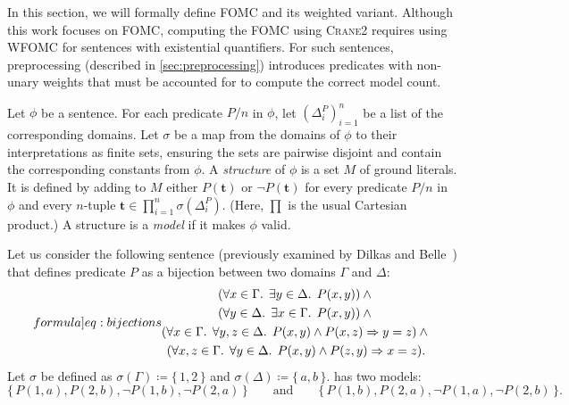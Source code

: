 \documentclass[a4paper,UKenglish,cleveref,autoref]{lipics-v2021}
\newcommand{\Cranetwo}{\textsc{Crane2}}
\begin{document}
In this section, we will formally define FOMC and its weighted variant. Although
this work focuses on FOMC, computing the FOMC using \Cranetwo{} requires using
WFOMC for sentences with existential quantifiers. For such sentences,
preprocessing (described in \cref{sec:preprocessing}) introduces predicates with
non-unary weights that must be accounted for to compute the correct model count.

\begin{definition}\label{def:model}
  Let $\phi$ be a sentence. For each predicate $P/n$ in $\phi$, let
  ${(\Delta_{i}^{P})}_{i=1}^{n}$ be a list of the corresponding domains. Let
  $\sigma$ be a map from the domains of $\phi$ to their interpretations as
  finite sets, ensuring the sets are pairwise disjoint and contain the
  corresponding constants from $\phi$. A \emph{structure} of $\phi$ is a set $M$
  of ground literals. It is defined by adding to $M$ either $P(\mathbf{t})$ or
  $\neg P(\mathbf{t})$ for every predicate $P/n$ in $\phi$ and every $n$-tuple
  $\mathbf{t} \in \prod_{i=1}^{n} \sigma(\Delta_{i}^{P})$. (Here, $\prod$ is the
  usual Cartesian product.) A structure is a \emph{model} if it makes $\phi$
  valid.
\end{definition}

\begin{example}\label{example:bijections}
  Let us consider the following sentence (previously examined by Dilkas and
  Belle~\cite{DBLP:conf/kr/DilkasB23}) that defines predicate $P$ as a bijection
  between two domains $\Gamma$ and $\Delta$:
  \begin{equation}\label[formula]{eq:bijections}
    \begin{gathered}
      (\forall x \in \Gamma\text{. }\exists y \in \Delta\text{. }P(x, y))\land{}\\
      (\forall y \in \Delta\text{. }\exists x \in \Gamma\text{. }P(x, y))\land{}\\
      (\forall x \in \Gamma\text{. }\forall y, z \in \Delta\text{. }P(x, y) \land P(x, z) \Rightarrow y = z)\land{}\\
      (\forall x, z \in \Gamma\text{. }\forall y \in \Delta\text{. }P(x, y) \land P(z, y) \Rightarrow x = z).
    \end{gathered}
  \end{equation}
  Let $\sigma$ be defined as $\sigma(\Gamma) \coloneqq \{\, 1, 2\,\}$ and
  $\sigma(\Delta) \coloneqq \{\,a, b\,\}$.  has two models:
  \[
    \{\, P(1, a), P(2, b), \neg P(1, b), \neg P(2, a) \,\} \qquad \text{and} \qquad \{\, P(1, b), P(2, a), \neg P(1, a), \neg P(2, b) \,\}.
  \]
\end{example}
\end{document}

